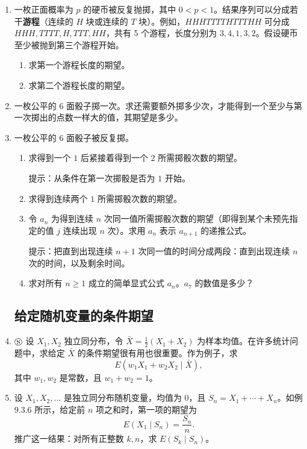 \documentclass[UTF8, 12pt, fontset=fandol, oneside]{ctexart}
\begin{document}
\begin{enumerate}
  \item 一枚正面概率为 $p$ 的硬币被反复抛掷，其中 $0<p<1$。结果序列可以分成若干\textbf{游程}（连续的 $H$ 块或连续的 $T$ 块）。例如，$HHHTTTTHTTTHH$ 可分成 $HHH,TTTT,H,TTT,HH$，共有 5 个游程，长度分别为 $3,4,1,3,2$。假设硬币至少被抛到第三个游程开始。
  \begin{enumerate}
    \item[(a)] 求第一个游程长度的期望。
    \item[(b)] 求第二个游程长度的期望。
  \end{enumerate}

  \item 一枚公平的 6 面骰子掷一次。求还需要额外掷多少次，才能得到一个至少与第一次掷出的点数一样大的值，其期望是多少。

  \item 一枚公平的 6 面骰子被反复掷。
  \begin{enumerate}
    \item[(a)] 求得到一个 $1$ 后紧接着得到一个 $2$ 所需掷骰次数的期望。

    \noindent 提示：从条件在第一次掷骰是否为 $1$ 开始。

    \item[(b)] 求得到连续两个 $1$ 所需掷骰次数的期望。
    \item[(c)] 令 $a_n$ 为得到连续 $n$ 次同一值所需掷骰次数的期望（即得到某个未预先指定的值 $j$ 连续出现 $n$ 次）。求用 $a_n$ 表示 $a_{n+1}$ 的递推公式。

    \noindent 提示：把直到出现连续 $n+1$ 次同一值的时间分成两段：直到出现连续 $n$ 次的时间，以及剩余时间。

    \item[(d)] 求对所有 $n\ge1$ 成立的简单显式公式 $a_n$。$a_7$ 的数值是多少？
  \end{enumerate}

\subsection*{给定随机变量的条件期望}

  \item $\circledS$ 设 $X_1,X_2$ 独立同分布，令 $\bar X=\frac12(X_1+X_2)$ 为样本均值。在许多统计问题中，求给定 $\bar X$ 的条件期望很有用也很重要。作为例子，求
  \[
    E(w_1X_1+w_2X_2\mid \bar X),
  \]
  其中 $w_1,w_2$ 是常数，且 $w_1+w_2=1$。

  \item 设 $X_1,X_2,\ldots$ 是独立同分布随机变量，均值为 $0$，且 $S_n=X_1+\cdots+X_n$。如例 9.3.6 所示，给定前 $n$ 项之和时，第一项的期望为
  \[
    E(X_1\mid S_n)=\frac{S_n}{n}.
  \]
  推广这一结果：对所有正整数 $k,n$，求 $E(S_k\mid S_n)$。


\end{enumerate}
\end{document}
